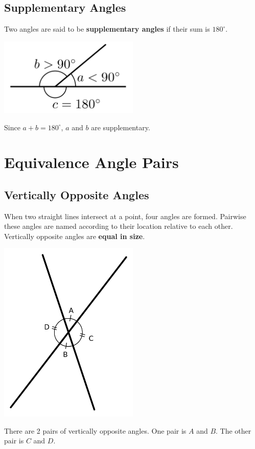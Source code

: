 \documentclass[12pt,a4paper]{article}
\begin{document}
\subsection{Supplementary Angles}
Two angles are said to be {\bf supplementary angles} if their sum is \(180^\circ\).
\begin{center}
\includegraphics[width=0.5\textwidth]{angles.png}
\end{center}
Since \(a+b=180^\circ\), \(a\) and \(b\) are supplementary.

\section{Equivalence Angle Pairs}
\subsection{Vertically Opposite Angles}
When two straight lines intersect at a point, four angles are formed. 
Pairwise these angles are named according to their location 
relative to each other.
Vertically opposite angles are {\bf equal in size}.
\begin{center}
\includegraphics[width=0.5\textwidth]{Vertical_Angles.png}
\end{center}
There are 2 pairs of vertically opposite angles. 
One pair is \(A\) and \(B\). The other pair is \(C\) and \(D\).
\newpage
\end{document}
